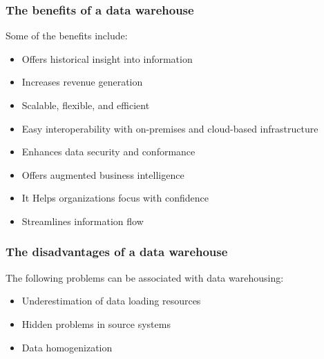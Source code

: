 \documentclass{article}
\begin{document}
\begin{multicols}{2}
\subsubsection {The benefits of a data warehouse}
 Some of the benefits include:
\begin{itemize}
\item Offers historical insight into information
\item Increases revenue generation
\item Scalable, flexible, and efficient
\item Easy interoperability with on-premises and cloud-based infrastructure
\item Enhances data security and conformance
\item Offers augmented business intelligence
\item It Helps organizations focus with confidence
\item Streamlines information flow
\end{itemize}

 
\subsubsection{The disadvantages of a data warehouse}
The following problems can be associated with data warehousing:
\begin{itemize}
\item Underestimation of data loading resources
\item Hidden problems in source systems
\item Data homogenization
\end{itemize}






\end{multicols}
\end{document}
